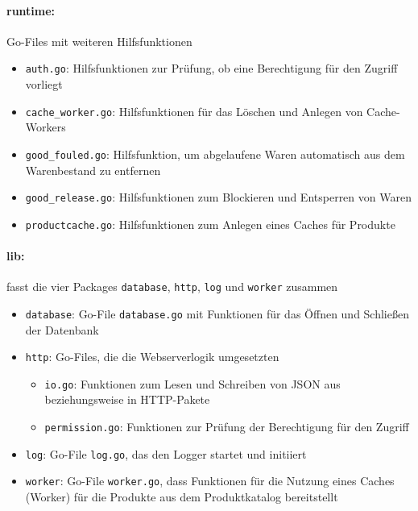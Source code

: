 \paragraph{runtime:} Go-Files mit weiteren Hilfsfunktionen
	\begin{itemize}	
	\item \texttt{auth.go}: Hilfsfunktionen zur Prüfung, ob eine Berechtigung für den Zugriff vorliegt
	\item \texttt{cache\_worker.go}: Hilfsfunktionen für das Löschen und Anlegen von Cache-Workers
	\item \texttt{good\_fouled.go}: Hilfsfunktion, um abgelaufene Waren automatisch aus dem Warenbestand zu entfernen
	\item \texttt{good\_release.go}: Hilfsfunktionen zum Blockieren und Entsperren von Waren
	\item \texttt{productcache.go}: Hilfsfunktionen zum Anlegen eines Caches für Produkte
	\end{itemize}
	


\newpage
\paragraph{lib:} fasst die vier Packages \texttt{database}, \texttt{http}, \texttt{log} und \texttt{worker} zusammen

	\begin{itemize}
	\item \texttt{database}: Go-File \texttt{database.go} mit Funktionen für das Öffnen und Schließen der Datenbank
	\item \texttt{http}: Go-Files, die die Webserverlogik umgesetzten
		\begin{itemize}
		\item \texttt{io.go}: Funktionen zum Lesen und Schreiben von JSON aus beziehungsweise in HTTP-Pakete
		\item \texttt{permission.go}: Funktionen zur Prüfung der Berechtigung für den Zugriff
		\end{itemize}	
	\item \texttt{log}: Go-File \texttt{log.go}, das den Logger startet und initiiert
	\item \texttt{worker}: Go-File \texttt{worker.go}, dass Funktionen für die Nutzung eines Caches (Worker) für die Produkte aus dem Produktkatalog bereitstellt 
	\end{itemize}


